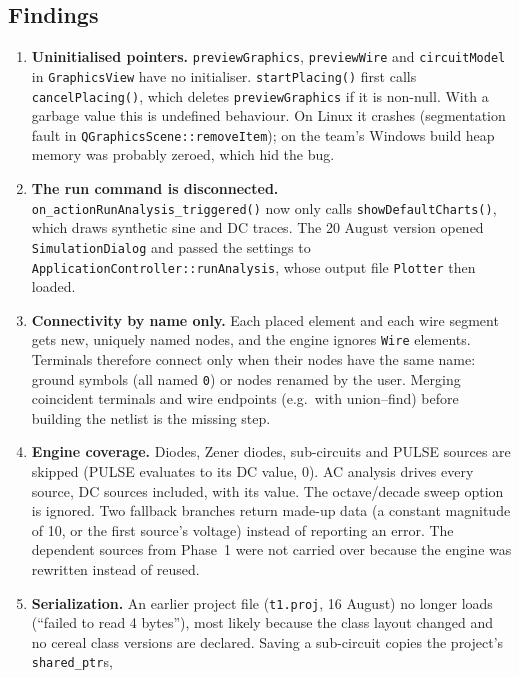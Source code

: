 \subsection{Findings}\label{sec:p2find}
\begin{enumerate}[leftmargin=2em]
  \item {} \textbf{Uninitialised pointers.} \texttt{previewGraphics}, \texttt{previewWire} and \texttt{circuitModel} in
    \texttt{GraphicsView} have no initialiser. \texttt{startPlacing()} first calls \texttt{cancelPlacing()}, which
    deletes \texttt{previewGraphics} if it is non-null. With a garbage value this is undefined behaviour. On Linux it crashes
    (segmentation fault in \texttt{QGraphicsScene::removeItem}); on the team's Windows build heap memory was
    probably zeroed, which hid the bug.
  \item {} \textbf{The run command is disconnected.} \texttt{on\_actionRunAnalysis\_triggered()} now only calls
    \texttt{showDefaultCharts()}, which draws synthetic sine and DC traces. The 20 August version opened
    \texttt{SimulationDialog} and passed the settings to \texttt{ApplicationController::runAnalysis}, whose output
    file \texttt{Plotter} then loaded.
  \item {} \textbf{Connectivity by name only.} Each placed element and each wire segment gets new, uniquely
    named nodes, and the engine ignores \texttt{Wire} elements. Terminals therefore connect only when their
    nodes have the same name: ground symbols (all named \texttt{0}) or nodes renamed by the user. Merging
    coincident terminals and wire endpoints (e.g.\ with union--find) before building the netlist is the missing step.
  \item {} \textbf{Engine coverage.} Diodes, Zener diodes, sub-circuits and PULSE sources are skipped (PULSE
    evaluates to its DC value, 0). AC analysis drives every source, DC sources included, with its value. The
    octave/decade sweep option is ignored. Two fallback branches return made-up data (a constant magnitude of
    10, or the first source's voltage) instead of reporting an error. The dependent sources from Phase~1 were
    not carried over because the engine was rewritten instead of reused.
  \item {} \textbf{Serialization.} An earlier project file (\texttt{t1.proj}, 16 August) no longer loads
    (``failed to read 4 bytes''), most likely because the class layout changed and no cereal class versions are declared. Saving a sub-circuit copies the project's \texttt{shared\_ptr}s,

\end{enumerate}
